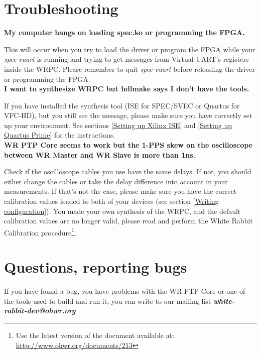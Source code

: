 \documentclass[a4paper, 12pt]{article}
\begin{document}
\newpage
\section{Troubleshooting}
\label{Troubleshooting}

\textbf{My computer hangs on loading spec.ko or programming the FPGA.}

This will occur when you try to load the driver or program the FPGA while your
\textit{spec-vuart} is running and trying to get messages from Virtual-UART's
registers inside the WRPC. Please remember to quit \textit{spec-vuart} before
reloading the driver or programming the FPGA.\\

\noindent \textbf{I want to synthesize WRPC but hdlmake says I don't have the
tools.}

If you have installed the synthesis tool (ISE for SPEC/SVEC or Quartus for
VFC-HD), but you still see the message, please make sure you have correctly set
up your environment. See sections \ref{Setting up Xilinx ISE} and \ref{Setting
up Quartus Prime} for the instructions.\\

\noindent \textbf{WR PTP Core seems to work but the 1-PPS skew on the
oscilloscope between WR Master and WR Slave is more than 1ns.}

Check if the oscilloscope cables you use have the same delays. If not, you
should either change the cables or take the delay difference into account in your
measurements. If that's not the case, please make sure you have the correct
calibration values loaded to both of your devices (see section \ref{Writing
configuration}). You made your own synthesis of the WRPC, and the default
calibration values are no longer valid, please read and perform the White Rabbit
Calibration procedure\footnote{Use the latest version of the document available
at: \url{http://www.ohwr.org/documents/213}}.

\section{Questions, reporting bugs}
\label{Questions}

If you have found a bug, you have problems with the WR PTP Core or one of the
tools used to build and run it, you can write to our mailing list
\textbf{\textit{white-rabbit-dev@ohwr.org}}
\end{document}
